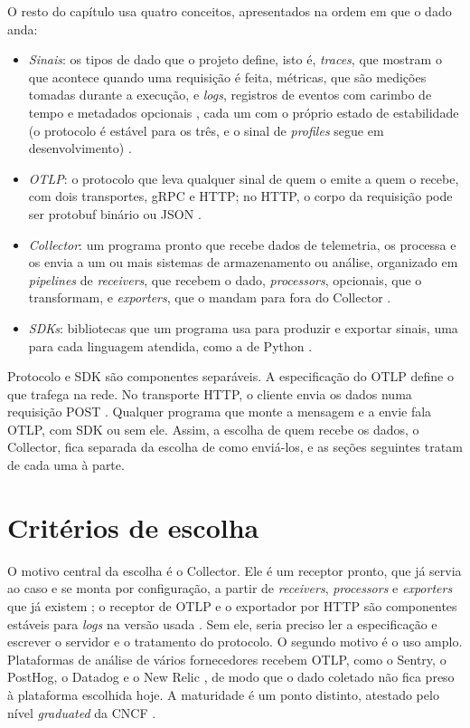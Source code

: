 O resto do capítulo usa quatro conceitos, apresentados na ordem em que o dado
anda:
\begin{itemize}
  \item \emph{Sinais}: os tipos de dado que o projeto define, isto é,
    \textit{traces}, que mostram o que acontece quando uma requisição é feita,
    métricas, que são medições tomadas durante a execução, e \textit{logs},
    registros de eventos com carimbo de tempo e metadados opcionais
    \citep{otel_signals}, cada um com o próprio estado de estabilidade (o
    protocolo é estável para os três, e o sinal de \textit{profiles} segue em
    desenvolvimento) \citep{otlp_spec_1_11_1}.
  \item \emph{OTLP}: o protocolo que leva qualquer sinal de quem o emite a
    quem o recebe, com dois transportes, gRPC e HTTP; no HTTP, o corpo da
    requisição pode ser protobuf binário ou JSON \citep{otlp_spec_1_11_1}.
  \item \emph{Collector}: um programa pronto que recebe dados de telemetria,
    os processa e os envia a um ou mais sistemas de armazenamento ou análise, organizado em
    \textit{pipelines} de \textit{receivers}, que recebem o dado,
    \textit{processors}, opcionais, que o transformam, e \textit{exporters},
    que o mandam para fora do Collector \citep{otel_collector_architecture}.
  \item \emph{SDKs}: bibliotecas que um programa usa para produzir e exportar
    sinais, uma para cada linguagem atendida, como a de Python
    \citep{otel_python_docs}.
\end{itemize}

Protocolo e SDK são componentes separáveis. A especificação do OTLP define o que
trafega na rede. No transporte HTTP, o cliente envia os dados numa requisição
POST \citep{otlp_spec_1_11_1}. Qualquer programa que monte a mensagem e a
envie fala OTLP, com SDK ou sem ele. Assim, a escolha de quem recebe os dados,
o Collector, fica separada da escolha de como enviá-los, e as seções seguintes
tratam de cada uma à parte.

\section{Critérios de escolha}
\label{sec:criterios}

O motivo central da escolha é o Collector. Ele é um receptor pronto, que já
servia ao caso e se monta por configuração, a partir de \textit{receivers},
\textit{processors} e \textit{exporters} que já existem
\citep{otel_collector_architecture}; o receptor de OTLP e o exportador por
HTTP são componentes estáveis para \textit{logs} na versão usada
\citep{otel_collector_v0_121_0}. Sem ele, seria preciso ler a especificação e
escrever o servidor e o tratamento do protocolo. O segundo motivo é o uso
amplo. Plataformas de análise de vários fornecedores recebem OTLP, como o
Sentry, o PostHog, o Datadog e o New Relic \citep{sentry_otlp, posthog_logs,
datadog_otlp_agent, newrelic_otlp}, de modo que o dado coletado não fica preso
à plataforma escolhida hoje. A maturidade é um ponto distinto, atestado pelo
nível \textit{graduated} da CNCF \citep{cncf_otel_project}.

